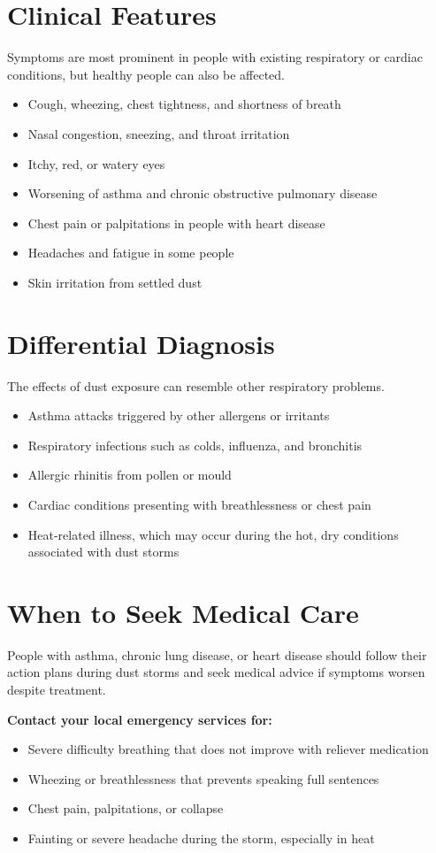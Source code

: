 \section*{Clinical Features}
Symptoms are most prominent in people with existing respiratory or cardiac conditions, but healthy people can also be affected.
\begin{itemize}
    \item Cough, wheezing, chest tightness, and shortness of breath
    \item Nasal congestion, sneezing, and throat irritation
    \item Itchy, red, or watery eyes
    \item Worsening of asthma and chronic obstructive pulmonary disease
    \item Chest pain or palpitations in people with heart disease
    \item Headaches and fatigue in some people
    \item Skin irritation from settled dust
\end{itemize}

\section*{Differential Diagnosis}
The effects of dust exposure can resemble other respiratory problems.
\begin{itemize}
    \item Asthma attacks triggered by other allergens or irritants
    \item Respiratory infections such as colds, influenza, and bronchitis
    \item Allergic rhinitis from pollen or mould
    \item Cardiac conditions presenting with breathlessness or chest pain
    \item Heat-related illness, which may occur during the hot, dry conditions associated with dust storms
\end{itemize}

\section*{When to Seek Medical Care}
People with asthma, chronic lung disease, or heart disease should follow their action plans during dust storms and seek medical advice if symptoms worsen despite treatment.

\textbf{Contact your local emergency services for:}
\begin{itemize}
    \item Severe difficulty breathing that does not improve with reliever medication
    \item Wheezing or breathlessness that prevents speaking full sentences
    \item Chest pain, palpitations, or collapse
    \item Fainting or severe headache during the storm, especially in heat
\end{itemize}


